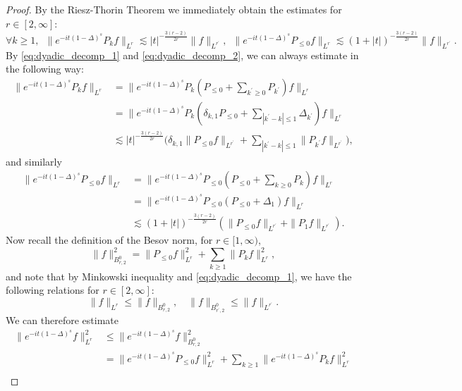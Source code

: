 \documentclass[12pt,a4paper]{amsart}
\numberwithin{equation}{section}
\begin{document}
\begin{proof}
		By the Riesz-Thorin Theorem we immediately obtain the estimates for $ r \in [2,\infty] $:
		\begin{equation*}
			\forall k \geq 1, \;\ \| e^{-it(1-\Delta)^s} P_k f \|_{L^r} \lesssim |t|^{-\frac{3(r-2)}{2r}} \| f \|_{L^{r^\prime}}, \;\
			\| e^{-it(1-\Delta)^s} P_{\leq0} f \|_{L^r} \lesssim (1+|t|)^{-\frac{3(r-2)}{2r}} \| f \|_{L^{r^\prime}}  .
		\end{equation*}
		By \eqref{eq:dyadic_decomp_1} and \eqref{eq:dyadic_decomp_2}, we can always estimate in the following way:
		\begin{align}
			\| e^{-it(1-\Delta)^s} P_k f \|_{L^r} 
			& = \| e^{-it(1-\Delta)^s} P_k (P_{\leq0} + \sum_{k^\prime\geq0} P_{k^\prime}) f \|_{L^r} \\
			& = \| e^{-it(1-\Delta)^s} P_k ( \delta_{k,1} P_{\leq0} + \sum_{|k^\prime-k|\leq1} \Delta_{k^\prime}) f \|_{L^r} \\
			& \lesssim |t|^{-\frac{3(r-2)}{2r}} \Big( \delta_{k,1} \| P_{\leq0} f \|_{L^{r^\prime}} + \sum_{|k^\prime-k|\leq1} \|  P_{k^\prime} f \|_{L^{r^\prime}}  \Big) ,
		\end{align}
		and similarly
		\begin{align}
			\| e^{-it(1-\Delta)^s} P_{\leq0} f \|_{L^r} 
			& = \| e^{-it(1-\Delta)^s} P_{\leq0} (P_{\leq0} + \sum_{k\geq0} P_k) f \|_{L^r} \\
			& = \| e^{-it(1-\Delta)^s} P_{\leq0} ( P_{\leq0} + \Delta_{1}) f \|_{L^r} \\
			& \lesssim (1+|t|)^{-\frac{3(r-2)}{2r}} ( \| P_{\leq0} f \|_{L^{r^\prime}} + \|  P_{1} f \|_{L^{r^\prime}}  ) .
		\end{align}
		Now recall the definition of the Besov norm, for $r \in [1,\infty) $,
		\begin{equation*}
			\| f \|_{B^{0}_{r,2}}^2 = \| P_{\leq0} f \|_{L^r}^2 + \sum_{k \geq 1} \| P_k f \|_{L^r}^2 ,
		\end{equation*}
		and note that by Minkowski inequality and \eqref{eq:dyadic_decomp_1}, we have the following relations for $r \in [2,\infty]$:
		\begin{equation*}
			\|  f \|_{L^r} \leq \| f \|_{B^{0}_{r,2}},  \quad \| f \|_{B^{0}_{r^\prime,2}} \leq \| f \|_{L^{r^\prime}} . 
		\end{equation*} 
		We can therefore estimate
		\begin{align}
			\| e^{-it(1-\Delta)^s} f \|_{L^r}^2 
			& \leq \| e^{-it(1-\Delta)^s} f \|_{B^{0}_{r,2}}^2 \\
			& = \| e^{-it(1-\Delta)^s} P_{\leq0} f \|_{L^r}^2 + \sum_{k \geq 1} \| e^{-it(1-\Delta)^s} P_k f \|_{L^r}^2 \\

\end{align}
\end{proof}
\end{document}

